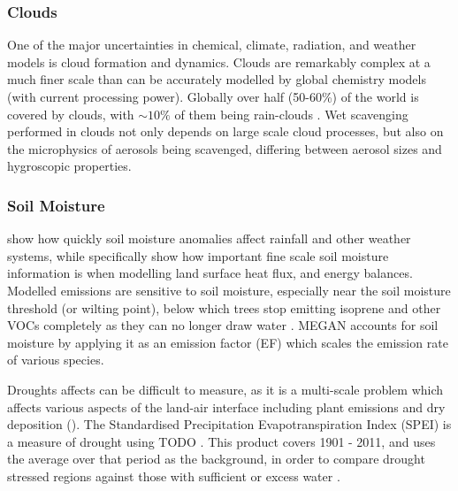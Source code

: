    \subsubsection{Clouds}
      \label{LR:Models:Uncert:Clouds}
      One of the major uncertainties in chemical, climate, radiation, and weather models is cloud formation and dynamics.
      Clouds are remarkably complex at a much finer scale than can be accurately modelled by global chemistry models (with current processing power).
      Globally over half (50-60\%) of the world is covered by clouds, with $\sim10\%$ of them being rain-clouds \citep{Kanakidou2005}.
      Wet scavenging performed in clouds not only depends on large scale cloud processes, but also on the microphysics of aerosols being scavenged, differing between aerosol sizes and hygroscopic properties.
      
    
    \subsubsection{Soil Moisture}
      \label{LR:Models:Uncert:SoilMoisture}
      
      \cite{Rowntree1983} show how quickly soil moisture anomalies affect rainfall and other weather systems, while \cite{Chen2001} specifically show how important fine scale soil moisture information is when modelling land surface heat flux, and energy balances.
      Modelled emissions are sensitive to soil moisture, especially near the soil moisture threshold (or wilting point), below which trees stop emitting isoprene and other VOCs completely as they can no longer draw water \citep{Bauwens2016}.
      MEGAN accounts for soil moisture by applying it as an emission factor (EF) which scales the emission rate of various species.
      
      
      Droughts affects can be difficult to measure, as it is a multi-scale problem which affects various aspects of the land-air interface including plant emissions and dry deposition (\cite{Wang2017}).
      The Standardised Precipitation Evapotranspiration Index (SPEI) is a measure of drought using TODO \cite{SPEI_website}.
      This product covers 1901 - 2011, and uses the average over that period as the background, in order to compare drought stressed regions against those with sufficient or excess water \cite{SPEI_website}.
      
    
    
  
